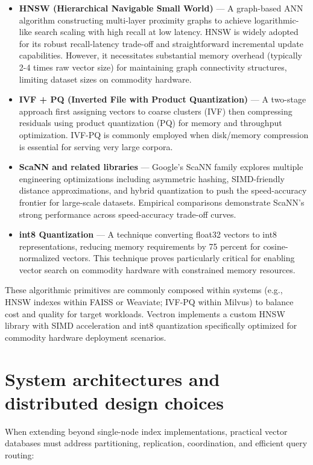 \begin{itemize}
    \item \textbf{HNSW (Hierarchical Navigable Small World)} --- A graph-based ANN algorithm constructing multi-layer proximity graphs to achieve logarithmic-like search scaling with high recall at low latency. HNSW is widely adopted for its robust recall-latency trade-off and straightforward incremental update capabilities. However, it necessitates substantial memory overhead (typically 2-4 times raw vector size) for maintaining graph connectivity structures, limiting dataset sizes on commodity hardware.
    
    \item \textbf{IVF + PQ (Inverted File with Product Quantization)} --- A two-stage approach first assigning vectors to coarse clusters (IVF) then compressing residuals using product quantization (PQ) for memory and throughput optimization. IVF-PQ is commonly employed when disk/memory compression is essential for serving very large corpora.
    
    \item \textbf{ScaNN and related libraries} --- Google's ScaNN family explores multiple engineering optimizations including asymmetric hashing, SIMD-friendly distance approximations, and hybrid quantization to push the speed-accuracy frontier for large-scale datasets. Empirical comparisons demonstrate ScaNN's strong performance across speed-accuracy trade-off curves.
    
    \item \textbf{int8 Quantization} --- A technique converting float32 vectors to int8 representations, reducing memory requirements by 75 percent for cosine-normalized vectors. This technique proves particularly critical for enabling vector search on commodity hardware with constrained memory resources.
\end{itemize}

These algorithmic primitives are commonly composed within systems (e.g., HNSW indexes within FAISS or Weaviate; IVF-PQ within Milvus) to balance cost and quality for target workloads. Vectron implements a custom HNSW library with SIMD acceleration and int8 quantization specifically optimized for commodity hardware deployment scenarios.

\section{System architectures and distributed design choices}
When extending beyond single-node index implementations, practical vector databases must address partitioning, replication, coordination, and efficient query routing:

